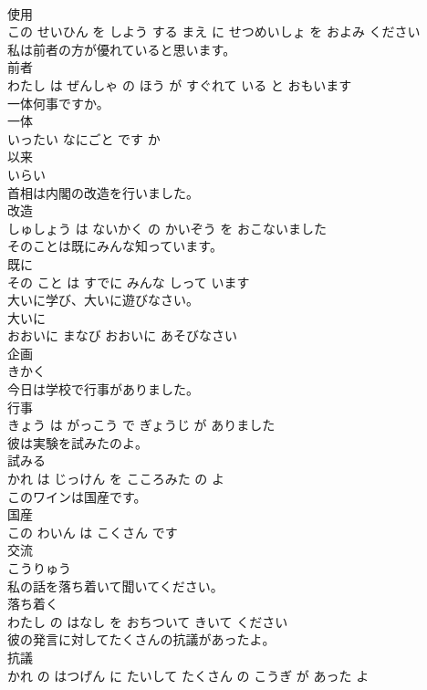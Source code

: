 \documentclass[8pt]{extreport}
\begin{document}
\begin{CJK}{UTF8}{min}
\\	使用 
\\	この せいひん を しよう する まえ に せつめいしょ を およみ ください			
\\	私は前者の方が優れていると思います。	
\\	前者 
\\	わたし は ぜんしゃ の ほう が すぐれて いる と おもいます			
\\	一体何事ですか。	
\\	一体 
\\	いったい なにごと です か			
\\	以来	
\\	いらい			
\\	首相は内閣の改造を行いました。	
\\	改造 
\\	しゅしょう は ないかく の かいぞう を おこないました			
\\	そのことは既にみんな知っています。	
\\	既に 
\\	その こと は すでに みんな しって います			
\\	大いに学び、大いに遊びなさい。	
\\	大いに 
\\	おおいに まなび おおいに あそびなさい			
\\	企画	
\\	きかく			
\\	今日は学校で行事がありました。	
\\	行事 
\\	きょう は がっこう で ぎょうじ が ありました			
\\	彼は実験を試みたのよ。	
\\	試みる 
\\	かれ は じっけん を こころみた の よ			
\\	このワインは国産です。	
\\	国産 
\\	この わいん は こくさん です			
\\	交流	
\\	こうりゅう			
\\	私の話を落ち着いて聞いてください。	
\\	落ち着く 
\\	わたし の はなし を おちついて きいて ください			
\\	彼の発言に対してたくさんの抗議があったよ。	
\\	抗議 
\\	かれ の はつげん に たいして たくさん の こうぎ が あった よ			

\end{CJK}
\end{document}
